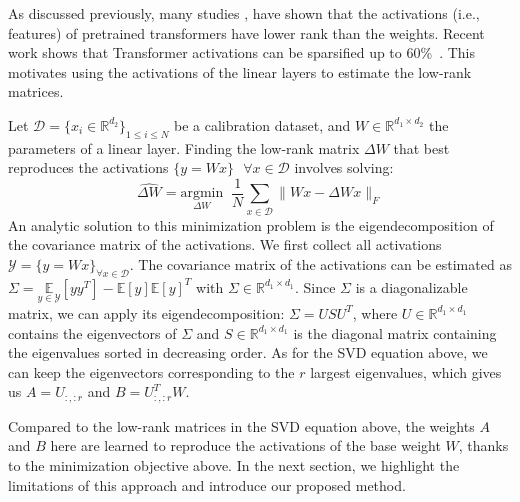 As discussed previously, many studies \citep{chen_drone}, \citep{yu_compressing_2023} have shown that the activations (i.e., features) of pretrained transformers have lower rank than the weights. Recent work shows that Transformer activations can be sparsified up to 60\%~\citep{TEAL}.
This motivates using the activations of the linear layers to estimate the low-rank matrices.

Let $\mathcal{D} = \{x_i \in \mathbb{R}^{d_{2}}\}_{1\leq i\leq N}$ be a calibration dataset, and $W \in \mathbb{R}^{d_{1} \times d_{2}}$ the parameters of a linear layer. Finding the low-rank matrix $\Delta W$ that best reproduces the activations $\{y=Wx\}~~~ \forall x\in \mathcal{D}$ involves solving:
\begin{equation}
\widehat{\Delta W} = \underset{{\Delta W}}{\mathrm{argmin}} \;\; \frac{1}{N}\sum\limits_{x \in \mathcal{D}}\|Wx - {\Delta Wx}\|_{F}
\end{equation}
An analytic solution to this minimization problem is the eigendecomposition of the covariance matrix of the activations. We first collect all activations $\mathcal{Y}=\{y=Wx\}_{\forall x\in \mathcal{D}}$. The covariance matrix of the activations can be estimated as $\Sigma = \underset{y \in \mathcal{Y}}{\mathbb{E}}\left[yy^T\right] - \mathbb{E}[y]\mathbb{E}[y]^T$ with $\Sigma \in \mathbb{R}^{d_{1} \times d_{1}}$. Since $\Sigma$ is a diagonalizable matrix, we can apply its eigendecomposition: $\Sigma = USU^{T}$, where $U \in \mathbb{R}^{d_{1} \times d_1}$ contains the eigenvectors of $\Sigma$ and $S \in \mathbb{R}^{d_{1} \times d_{1}}$ is the diagonal matrix containing the eigenvalues sorted in decreasing order. As for the SVD equation above, we can keep the eigenvectors corresponding to the $r$ largest eigenvalues, which gives us $A = U_{:, :r}$ and $B = U_{:, :r}^{T}W$.

Compared to the low-rank matrices in the SVD equation above, the weights $A$ and $B$ here are learned to reproduce the activations of the base weight $W$, thanks to the minimization objective above. In the next section, we highlight the limitations of this approach and introduce our proposed method.


